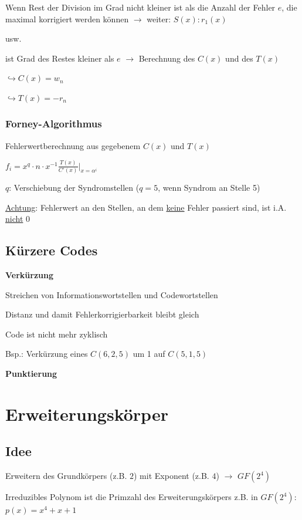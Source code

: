 Wenn Rest der Division im Grad nicht kleiner ist als die Anzahl der Fehler $e$, die maximal korrigiert
werden können $\rightarrow$ weiter: $S(x) : r_1(x)$

usw.

ist Grad des Restes kleiner als $e$ $\rightarrow$ Berechnung des $C(x)$ und des $T(x)$

$\hookrightarrow C(x) = w_n$

$\hookrightarrow T(x) = -r_n$

\subsubsection{Forney-Algorithmus}

Fehlerwertberechnung aus gegebenem $C(x)$ und $T(x)$

$\displaystyle{
    f_i = x^q \cdot n \cdot x^{-1} \frac{T(x)}{C'(x)}\bigg \vert_{x=\alpha^i}
}$

$q$: Verschiebung der Syndromstellen ($q=5$, wenn Syndrom an Stelle 5)

\underline{Achtung}: Fehlerwert an den Stellen, an dem \underline{keine} Fehler passiert sind, ist i.A.
\underline{nicht} 0

\subsection{Kürzere Codes}

\textbf{Verkürzung}

Streichen von Informationswortstellen und Codewortstellen

Distanz und damit Fehlerkorrigierbarkeit bleibt gleich

Code ist nicht mehr zyklisch

Bsp.: Verkürzung eines $C(6, 2, 5)$ um 1 auf $C(5, 1, 5)$

\textbf{Punktierung}


\section{Erweiterungskörper}

\subsection{Idee}

Erweitern des Grundkörpers (z.B. $2$) mit Exponent (z.B. $4$) $\rightarrow$
$GF(2^4)$

Irreduzibles Polynom ist die Primzahl des Erweiterungskörpers z.B. in $GF(2^4)$:\\
$\displaystyle{
    p(x) = x^4 + x + 1
}$

